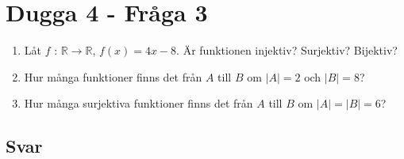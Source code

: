 \documentclass[a4paper,12pt]{article}
\begin{document}
\section{Dugga 4 - Fråga 3}
\begin{enumerate}[label=\alph*)]
    \item Låt $f$ : $\mathbb{R} \rightarrow \mathbb{R}$, $f(x) = 4x - 8$. Är funktionen
    injektiv? Surjektiv? Bijektiv?
    \item Hur många funktioner finns det från $A$ till $B$ om $|A| = 2$ och
    $|B| = 8$?
    \item Hur många surjektiva funktioner finns det från $A$ till $B$ om $|A| =
    |B| = 6$?
\end{enumerate}
\subsection*{Svar}
\end{document}
